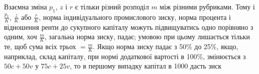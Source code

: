 Взаємна зміна $p_1$, $z$ і $r$ є тільки різний розподіл $m$ між різними
рубриками. Тому і $\frac{p_1}{K}$, $\frac{z}{K}$ або $\frac{r}{K}$, норма індивідуального
промислового зиску, норма процента і відношення ренти до
сукупного капіталу можуть підвищуватись одно порівняно з одним,
хоч $\frac{m}{K}$, загальна норма зиску, падає; умовою при цьому
лишається тільки те, щоб сума всіх трьох $= \frac{m}{K}$. Якщо норма
зиску падає з 50\% до 25\%, якщо, наприклад, склад капіталу,
при нормі додаткової вартості в 100\%, змінюється з $50 c + 50 v$
у $75 c + 25 v$, то в першому випадку капітал в 1000 дасть зиск
\parbreak{}  %

